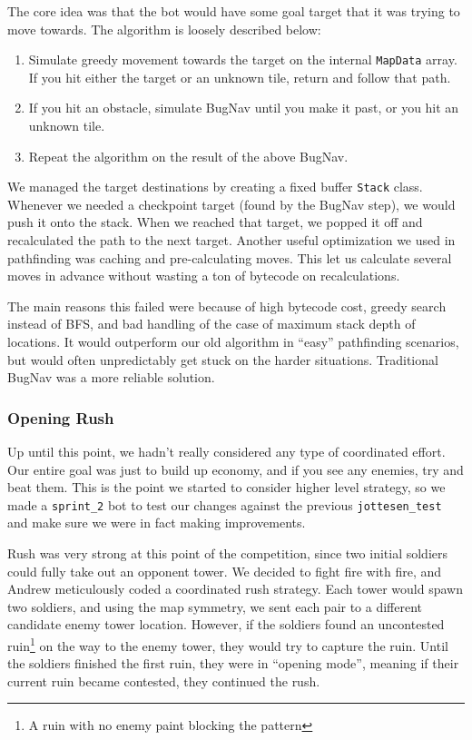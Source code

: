 The core idea was that the bot would have some goal target that it was trying to move towards. The algorithm is loosely described below:
\begin{enumerate}
  \item Simulate greedy movement towards the target on the internal \verb|MapData| array. If you hit either the target or an unknown tile, return and follow that path.
  \item If you hit an obstacle, simulate BugNav until you make it past, or you hit an unknown tile.
  \item Repeat the algorithm on the result of the above BugNav.
\end{enumerate}
We managed the target destinations by creating a fixed buffer \verb|Stack| class. Whenever we needed a checkpoint target (found by the BugNav step), we would push it onto the stack. When we reached that target, we popped it off and recalculated the path to the next target. Another useful optimization we used in pathfinding was caching and pre-calculating moves. This let us calculate several moves in advance without wasting a ton of bytecode on recalculations.

\medskip

The main reasons this failed were because of high bytecode cost, greedy search instead of BFS, and bad handling of the case of maximum stack depth of locations. It would outperform our old algorithm in ``easy'' pathfinding scenarios, but would often unpredictably get stuck on the harder situations. Traditional BugNav was a more reliable solution.

\subsubsection{Opening Rush}

Up until this point, we hadn't really considered any type of coordinated effort. Our entire goal was just to build up economy, and if you see any enemies, try and beat them. This is the point we started to consider higher level strategy, so we made a \verb|sprint_2| bot to test our changes against the previous \verb|jottesen_test| and make sure we were in fact making improvements.

\medskip

Rush was very strong at this point of the competition, since two initial soldiers could fully take out an opponent tower. We decided to fight fire with fire, and Andrew meticulously coded a coordinated rush strategy. Each tower would spawn two soldiers, and using the map symmetry, we sent each pair to a different candidate enemy tower location. However, if the soldiers found an uncontested ruin\footnote{A ruin with no enemy paint blocking the pattern} on the way to the enemy tower, they would try to capture the ruin. Until the soldiers finished the first ruin, they were in ``opening mode'', meaning if their current ruin became contested, they continued the rush.


